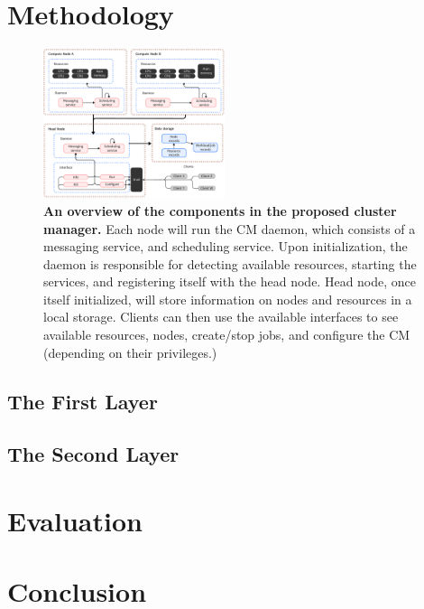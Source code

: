 \documentclass[sigconf]{acmart}
\begin{document}
\section{Methodology}
\begin{figure}[ht]
    \centering
    \includegraphics[width=0.475\textwidth]{figures/overview.pdf}
    \caption{
        \textbf{An overview of the components in the proposed cluster manager.}
        Each node will run the CM daemon, which consists of a messaging service, and scheduling service.
        Upon initialization, the daemon is responsible for detecting available resources, starting the services, and registering
        itself with the head node. Head node, once itself initialized, will store information on nodes and resources in a local
        storage. Clients can then use the available interfaces to see available resources, nodes, create/stop jobs, and
        configure the CM (depending on their privileges.)
    }
\end{figure}

\subsection{The First Layer}

\subsection{The Second Layer}

\section{Evaluation}

\section{Conclusion}




\end{document}

